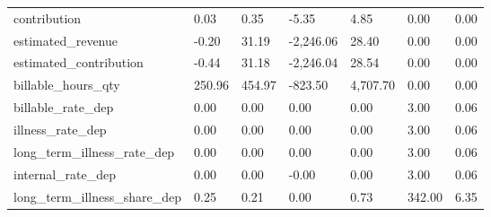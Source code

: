 \begin{landscape}
\begin{longtable}[h!]{lllllll}
contribution & 0.03 & 0.35 & -5.35 & 4.85 & 0.00 & 0.00 \\
estimated_revenue & -0.20 & 31.19 & -2,246.06 & 28.40 & 0.00 & 0.00 \\
estimated_contribution & -0.44 & 31.18 & -2,246.04 & 28.54 & 0.00 & 0.00 \\
billable_hours_qty & 250.96 & 454.97 & -823.50 & 4,707.70 & 0.00 & 0.00 \\
billable_rate_dep & 0.00 & 0.00 & 0.00 & 0.00 & 3.00 & 0.06 \\
illness_rate_dep & 0.00 & 0.00 & 0.00 & 0.00 & 3.00 & 0.06 \\
long_term_illness_rate_dep & 0.00 & 0.00 & 0.00 & 0.00 & 3.00 & 0.06 \\
internal_rate_dep & 0.00 & 0.00 & -0.00 & 0.00 & 3.00 & 0.06 \\
long_term_illness_share_dep & 0.25 & 0.21 & 0.00 & 0.73 & 342.00 & 6.35 \\
\end{longtable}\end{landscape}
